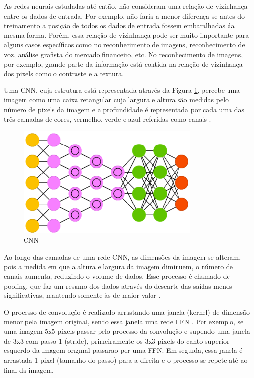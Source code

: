 As redes neurais estudadas até então, não consideram uma relação de vizinhança entre os dados de entrada. Por exemplo, não faria a menor diferença se antes do treinamento a posição de todos os dados de entrada fossem embaralhadas da mesma forma. Porém, essa relação de vizinhança pode ser muito importante para alguns casos específicos como no reconhecimento de imagens, reconhecimento de voz, análise grafista do mercado financeiro, etc. No reconhecimento de imagens, por exemplo, grande parte da informação está contida na relação de vizinhança dos pixels como o contraste e a textura.

Uma CNN, cuja estrutura está representada através da Figura \ref{fig:cnn}, percebe uma imagem como uma caixa retangular cuja largura e altura são medidas pelo número de pixels da imagem e a profundidade é representada por cada uma das três camadas de cores, vermelho, verde e azul referidas como canais \cite{veen2016}.

\begin{figure}[H]
    \centering
    \caption{\label{fig:cnn}CNN}
    \includegraphics[width=0.8\textwidth]{img/revisao_bibliografica/cnn.png}
\end{figure}

Ao longo das camadas de uma rede CNN, as dimensões da imagem se alteram, pois a medida em que a altura e largura da imagem diminuem, o número de canais aumenta, reduzindo o volume de dados. Esse processo é chamado de pooling, que faz um resumo dos dados através do descarte das saídas menos significativas, mantendo somente às de maior valor \cite{veen2016}.

O processo de convolução é realizado arrastando uma janela (kernel) de dimensão menor pela imagem original, sendo essa janela uma rede FFN \cite{veen2016}. Por exemplo, se uma imagem 5x5 pixels passar pelo processo da convolução e supondo uma janela de 3x3 com passo 1 (stride), primeiramente os 3x3 pixels do canto superior esquerdo da imagem original passarão por uma FFN. Em seguida, essa janela é arrastada 1 pixel (tamanho do passo) para a direita e o processo se repete até ao final da imagem.

